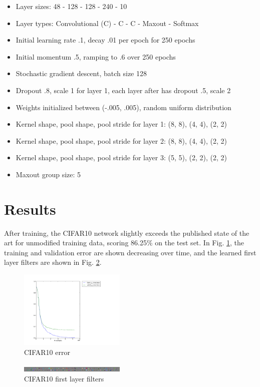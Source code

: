 \documentclass[journal]{IEEEtran}
\begin{document}
\begin{itemize}
\item Layer sizes: 48 - 128 - 128 - 240 - 10
\item Layer types: Convolutional (C) - C - C - Maxout - Softmax
\item Initial learning rate .1, decay .01 per epoch for 250 epochs
\item Initial momentum .5, ramping to .6 over 250 epochs
\item Stochastic gradient descent, batch size 128 
\item Dropout .8, scale 1 for layer 1, each layer after has dropout .5, scale 2
\item Weights initialized between (-.005, .005), random uniform distribution
\item Kernel shape, pool shape, pool stride for layer 1: (8, 8), (4, 4), (2, 2) 
\item Kernel shape, pool shape, pool stride for layer 2: (8, 8), (4, 4), (2, 2) 
\item Kernel shape, pool shape, pool stride for layer 3: (5, 5), (2, 2), (2, 2) 
\item Maxout group size: 5 
\end{itemize}

\section{Results}
After training, the CIFAR10 network slightly exceeds the published state of the
art for unmodified training data, scoring 86.25\% on the test set. In Fig. 
\ref{fig:cifartrain}, the training and validation error are shown decreasing
over time, and the learned first layer filters are shown in Fig. 
\ref{fig:cifarweights}.

\begin{figure}[h!]
\centering
  \includegraphics[width=0.45\textwidth]{cifartrain.png}
  \caption{CIFAR10 error}
\label{fig:cifartrain}
\end{figure}

\begin{figure}[h!]
\centering
  \includegraphics[width=0.45\textwidth]{cifarweights.png}
  \caption{CIFAR10 first layer filters}
\label{fig:cifarweights}
\end{figure}
\end{document}
